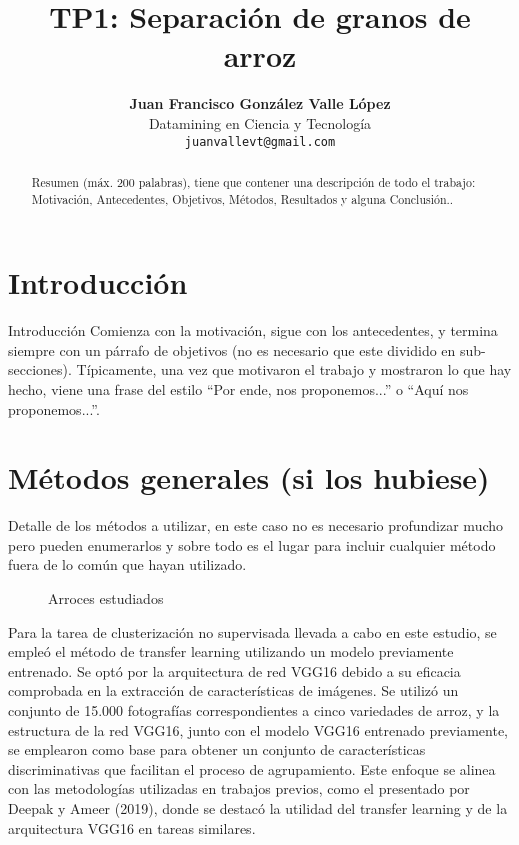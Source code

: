 \documentclass{article}
\title{TP1: Separación de granos de arroz}
\author{\textbf{Juan Francisco González Valle López} \\ Datamining en Ciencia y Tecnología\\\texttt{juanvallevt@gmail.com}}
\begin{document}
\maketitle

\begin{abstract}
Resumen (máx. 200 palabras), tiene que contener una descripción de todo el trabajo:
Motivación, Antecedentes, Objetivos, Métodos, Resultados y alguna Conclusión..
\end{abstract}

\section{Introducción}
Introducción Comienza con la motivación, sigue con los antecedentes, y termina siempre con un párrafo de objetivos (no es necesario que este dividido en sub-secciones).
Típicamente, una vez que motivaron el trabajo y mostraron lo que hay hecho, viene una frase del estilo “Por ende, nos proponemos...” o “Aquí nos proponemos...”.

\section{Métodos generales (si los hubiese)} 
Detalle de los métodos a utilizar, en este caso no es necesario profundizar mucho pero pueden enumerarlos y sobre todo es el lugar para incluir cualquier método fuera de lo común que hayan utilizado.

\begin{figure}[!hb]
  \centering
  \caption{Arroces estudiados}
\end{figure}

Para la tarea de clusterización no supervisada llevada a cabo en este estudio, se empleó el método de transfer learning utilizando un modelo previamente entrenado. Se optó por la arquitectura de red VGG16 debido a su eficacia comprobada en la extracción de características de imágenes. Se utilizó un conjunto de 15.000 fotografías correspondientes a cinco variedades de arroz, y la estructura de la red VGG16, junto con el modelo VGG16 entrenado previamente, se emplearon como base para obtener un conjunto de características discriminativas que facilitan el proceso de agrupamiento. Este enfoque se alinea con las metodologías utilizadas en trabajos previos, como el presentado por Deepak y Ameer (2019), donde se destacó la utilidad del transfer learning y de la arquitectura VGG16 en tareas similares.
\end{document}
